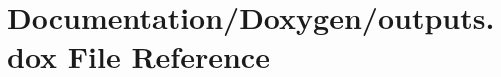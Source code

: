 \hypertarget{outputs_8dox}{}\section{Documentation/\+Doxygen/outputs.dox File Reference}
\label{outputs_8dox}
